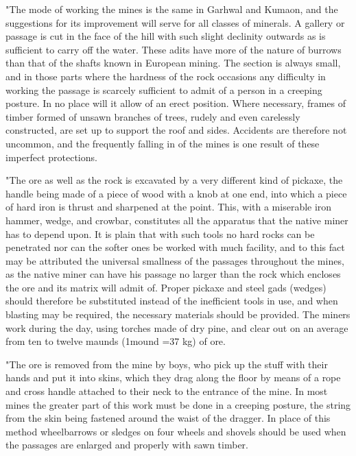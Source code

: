 \begin{myquote}
"The mode of working the mines is the same in Garhwal and Kumaon, and the suggestions for its improvement will serve for all classes of minerals. A gallery or passage is cut in the face of the hill with such slight declinity outwards as is sufficient to carry off the water. These adits have more of the nature of burrows than that of the shafts known in European mining. The section is always small, and in those parts where the hardness of the rock occasions any difficulty in working the passage is scarcely sufficient to admit of a person in a creeping posture. In no place will it allow of an erect position. Where necessary, frames of timber formed of unsawn branches of trees, rudely and even carelessly constructed, are set up to support the roof and sides. Accidents are therefore not uncommon, and the frequently falling in of the mines is one result of these imperfect protections.
\end{myquote}

\begin{myquote}
"The ore as well as the rock is excavated by a very different kind of pickaxe, the handle being made of a piece of wood with a knob at one end, into which a piece of hard iron is thrust and sharpened at the point. This, with a miserable iron hammer, wedge, and crowbar, constitutes all the apparatus that the native miner has to depend upon. It is plain that with such tools no hard rocks can be penetrated nor can the softer ones be worked with much facility, and to this fact may be attributed the universal smallness of the passages throughout the mines, as the native miner can have his passage no larger than the rock which encloses the ore and its matrix will admit of. Proper pickaxe and steel gads (wedges) should therefore be substituted instead of the inefficient tools in use, and when blasting may be required, the necessary materials should be provided. The miners work during the day, using torches made of dry pine, and clear out on an average from ten to twelve maunds (1mound =37 kg) of ore.
\end{myquote}

\begin{myquote}
"The ore is removed from the mine by boys, who pick up the stuff with their hands and put it into skins, which they drag along the floor by means of a rope and cross handle attached to their neck to the entrance of the mine. In most mines the greater part of this work must be done in a creeping posture, the string from the skin being fastened around the waist of the dragger. In place of this method wheelbarrows or sledges on four wheels and shovels should be used when the passages are enlarged and properly with sawn timber.
\end{myquote}

